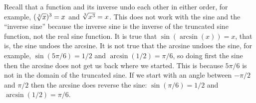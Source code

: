 
Recall that a function and its inverse undo each other in either
order, for example, $(\root3\of x)^3=x$ and $\root3\of{x^3}=x$. This
does not work with the sine and the ``inverse sine'' because the
inverse sine is the inverse of the truncated sine function, not the
real sine function. It is true that $\sin(\arcsin(x))=x$, that is, the
sine undoes the arcsine. It is not true that the arcsine undoes the
sine, for example, $\sin(5\pi/6)=1/2$ and $\arcsin(1/2)=\pi/6$, so
doing first the sine then the arcsine does not get us back where we
started. This is because $5\pi/6$ is not in the domain of the
truncated sine. If we start with an angle between $-\pi/2$ and $\pi/2$
then the arcsine does reverse the sine: $\sin(\pi/6)=1/2$ and
$\arcsin(1/2)=\pi/6$.


